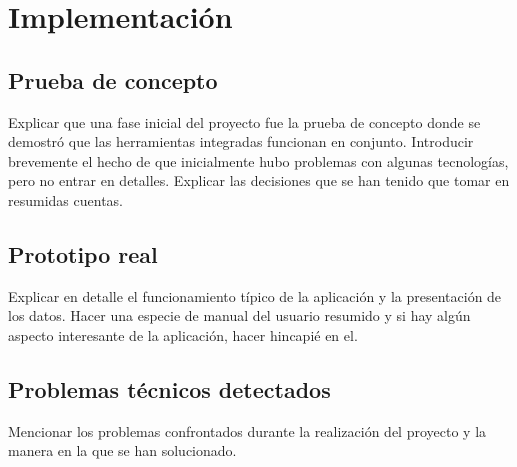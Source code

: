 \chapter{Implementación}
\section{Prueba de concepto}
Explicar que una fase inicial del proyecto fue la prueba de concepto donde se demostró que las herramientas integradas funcionan en conjunto. Introducir brevemente el hecho de que inicialmente hubo problemas con algunas tecnologías, pero no entrar en detalles. Explicar las decisiones que se han tenido que tomar en resumidas cuentas.
\section{Prototipo real}
Explicar en detalle el funcionamiento típico de la aplicación y la presentación de los datos. Hacer una especie de manual del usuario resumido y si hay algún aspecto interesante de la aplicación, hacer hincapié en el.
\section{Problemas técnicos detectados}
Mencionar los problemas confrontados durante la realización del proyecto y la manera en la que se han solucionado.
